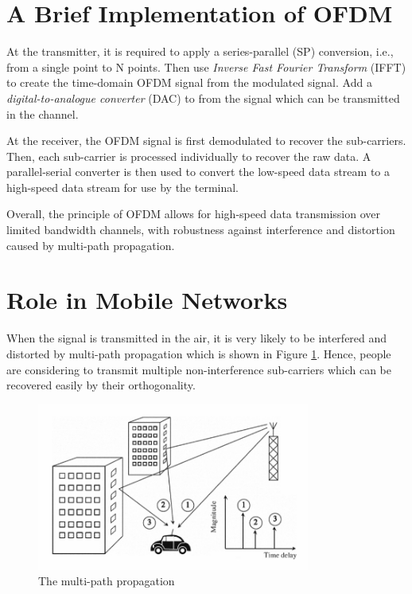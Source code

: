 \documentclass{article}
\begin{document}
\section{A Brief Implementation of OFDM}
At the transmitter, it is required to apply a series-parallel (SP) conversion, i.e., from a single point to N points. Then use \textit{Inverse Fast Fourier Transform} (IFFT) to create the time-domain OFDM signal from the modulated signal. Add a \textit{digital-to-analogue converter} (DAC) to from the signal which can be transmitted in the channel.

At the receiver, the OFDM signal is first demodulated to recover the sub-carriers. Then, each sub-carrier is processed individually to recover the raw data. A parallel-serial converter is then used to convert the low-speed data stream to a high-speed data stream for use by the terminal.

Overall, the principle of OFDM allows for high-speed data transmission over limited bandwidth channels, with robustness against interference and distortion caused by multi-path propagation.

\section{Role in Mobile Networks}
When the signal is transmitted in the air, it is very likely to be interfered and distorted by multi-path propagation which is shown in Figure \ref{fig:multipath propagation}. Hence, people are considering to transmit multiple non-interference sub-carriers which can be recovered easily by their orthogonality.

\begin{figure}[!h]
\centering
\includegraphics[width=0.8\textwidth]{images/multipath propagation.png}
\caption{\label{fig:multipath propagation}The multi-path propagation}
\end{figure}
\end{document}

